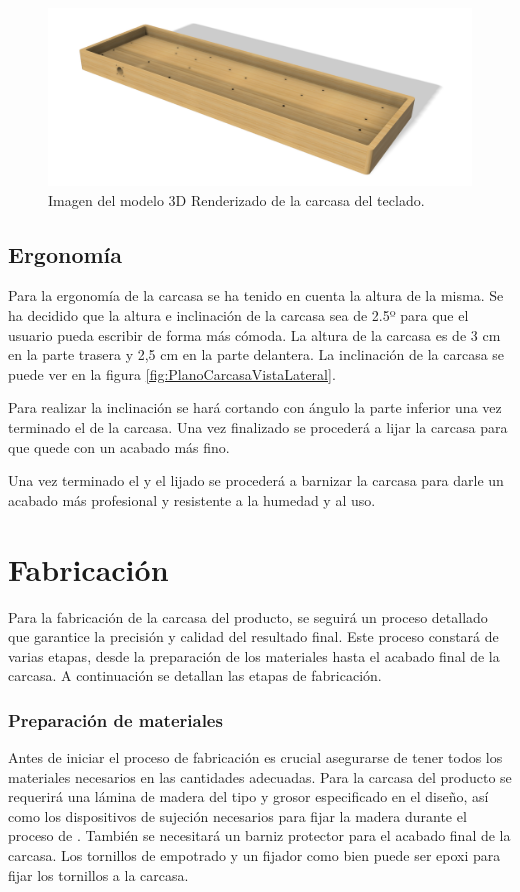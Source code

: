 \begin{figure}[H]
    \centering
    \includegraphics[width=1\textwidth]{imagenes/Capitulos/Cap06/Modelo3DRender.png}
    \caption{Imagen del modelo 3D Renderizado de la carcasa del teclado.}
    \label{fig:Modelo3DRender}
\end{figure}

\subsection{Ergonomía}
Para la ergonomía de la carcasa se ha tenido en cuenta la altura de la misma. Se ha decidido que la altura e inclinación de la carcasa sea de 2.5º para que el usuario pueda escribir de forma más cómoda. La altura de la carcasa es de 3 cm en la parte trasera y 2,5 cm en la parte delantera. La inclinación de la carcasa se puede ver en la figura \ref{fig:PlanoCarcasaVistaLateral}.

Para realizar la inclinación se hará cortando con ángulo la parte inferior una vez terminado el  de la carcasa. Una vez finalizado se procederá a lijar la carcasa para que quede con un acabado más fino.

Una vez terminado el  y el lijado se procederá a barnizar la carcasa para darle un acabado más profesional y resistente a la humedad y al uso.

\section{Fabricación}
Para la fabricación de la carcasa del producto, se seguirá un proceso detallado que garantice la precisión y calidad del resultado final. Este proceso constará de varias etapas, desde la preparación de los materiales hasta el acabado final de la carcasa. A continuación se detallan las etapas de fabricación.

\subsubsection{Preparación de materiales}
Antes de iniciar el proceso de fabricación es crucial asegurarse de tener todos los materiales necesarios en las cantidades adecuadas. Para la carcasa del producto se requerirá una lámina de madera del tipo y grosor especificado en el diseño, así como los dispositivos de sujeción necesarios para fijar la madera durante el proceso de . También se necesitará un barniz protector para el acabado final de la carcasa. Los tornillos de empotrado y un fijador como bien puede ser epoxi para fijar los tornillos a la carcasa.

